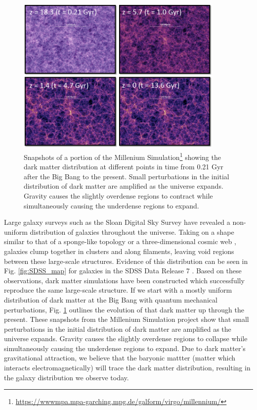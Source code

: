 \begin{figure}
    \includegraphics[width=0.9\textwidth]{Images/Intro/Millenium_simulation}
    \caption[Dark matter simulation]{Snapshots of a portion of the Millenium 
    Simulation\footnote{\url{https://wwwmpa.mpa-garching.mpg.de/galform/virgo/millennium/}} 
    showing the dark matter distribution at different points in time from 0.21 
    Gyr after the Big Bang to the present.  Small perturbations in the initial 
    distribution of dark matter are amplified as the universe expands.  Gravity 
    causes the slightly overdense regions to contract while simultaneously 
    causing the underdense regions to expand.}
    \label{fig:DMsim}
\end{figure}

Large galaxy surveys such as the Sloan Digital Sky Survey \citep[SDSS;][]
{York00} have revealed a non-uniform distribution of galaxies throughout 
the universe.  Taking on a shape similar to that of a sponge-like topology 
\citep{Gott98} or a three-dimensional cosmic web \citep{Bond96}, galaxies clump 
together in clusters and along filaments, leaving void regions between these 
large-scale structures.  Evidence of this distribution can be seen in Fig. 
\ref{fig:SDSS_map} for galaxies in the SDSS Data Release 7 \citep[SDSS DR7;][]
{Abazajian09}.  Based on these observations, dark matter simulations have been 
constructed which successfully reproduce the same large-scale structure.  If we 
start with a mostly uniform distribution of dark matter at the Big Bang with 
quantum mechanical perturbations, Fig. \ref{fig:DMsim} outlines the evolution of 
that dark matter up through the present.  These snapshots from the Millenium 
Simulation project \citep{Springel05} show that small perturbations in the 
initial distribution of dark matter are amplified as the universe expands.  
Gravity causes the slightly overdense regions to collapse while simultaneously 
causing the underdense regions to expand.  Due to dark matter's gravitational 
attraction, we believe that the baryonic mattter (matter which interacts 
electromagnetically) will trace the dark matter distribution, resulting in the 
galaxy distribution we observe today.


